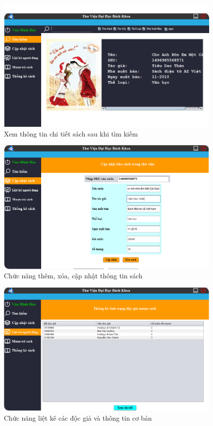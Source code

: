 \documentclass[12pt]{report}
\begin{document}
						\begin{figure}
						\centering
						\includegraphics[scale=0.65]{images/mgr2.png}
						\caption{Xem thông tin chi tiết sách sau khi tìm kiếm}
						\label{fig:mgrbookinfor}
						\end{figure}
						
						\begin{figure}
						\centering
						\includegraphics[scale=0.65]{images/mgr3.png}
						\caption{Chức năng thêm, xóa, cập nhật thông tin sách}
						\label{fig:mgrupdatebook}
						\end{figure}
						
						\begin{figure}
						\centering
						\includegraphics[scale=0.65]{images/mgr4.png}
						\caption{Chức năng liệt kê các độc giả và thông tin cơ bản}
						\label{fig:mgruserstats1}
						\end{figure}
						
\end{document}
